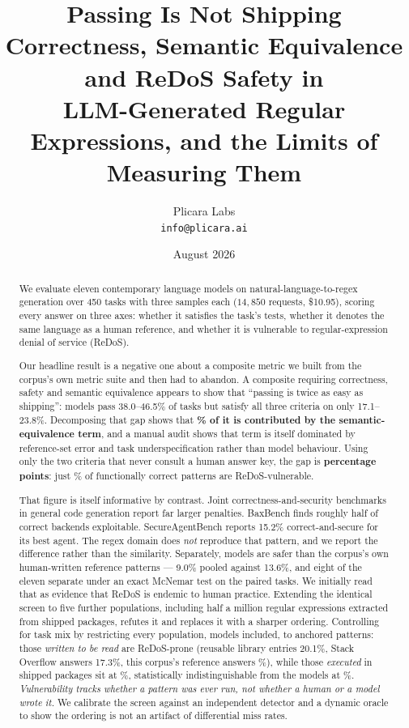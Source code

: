 \documentclass[11pt]{article}
\title{\textbf{Passing Is Not Shipping}\\[0.4em]
\large Correctness, Semantic Equivalence and ReDoS Safety in\\
LLM-Generated Regular Expressions, and the Limits of Measuring Them}
\author{Plicara Labs\\\texttt{info@plicara.ai}}
\date{August 2026}
\begin{document}
\maketitle

\begin{abstract}
\noindent
We evaluate eleven contemporary language models on natural-language-to-regex
generation over 450 tasks with three samples each ($14{,}850$ requests,
\$10.95), scoring every answer on three axes: whether it satisfies the task's
tests, whether it denotes the same language as a human reference, and whether
it is vulnerable to regular-expression denial of service (ReDoS).

Our headline result is a negative one about a composite metric we built from
the corpus's own metric suite and then had to abandon. A composite requiring correctness,
safety and semantic equivalence appears to show that ``passing is twice as
easy as shipping'': models pass 38.0--46.5\% of tasks but satisfy all three
criteria on only 17.1--23.8\%. Decomposing that gap shows that
\textbf{\equivshare{}\% of it is contributed by the semantic-equivalence term}, and a
manual audit shows that term is itself dominated by reference-set error and
task underspecification rather than model behaviour. Using only the two
criteria that never consult a human answer key, the gap is
\textbf{\safetyloss{} percentage points}: just \vulngivencorrect{}\% of functionally correct patterns
are ReDoS-vulnerable.

That figure is itself informative by contrast. Joint correctness-and-security
benchmarks in general code generation report far larger penalties. BaxBench
finds roughly half of correct backends exploitable. SecureAgentBench reports
15.2\% correct-and-secure for its best agent. The regex domain does \emph{not}
reproduce that pattern, and we report the difference rather than the
similarity. Separately, models are safer than the corpus's own human-written
reference patterns --- 9.0\% pooled against 13.6\%, and eight of the eleven
separate under an exact McNemar test on the paired tasks. We initially read
that as evidence that ReDoS is endemic to human practice. Extending the
identical screen to five further populations, including half a million
regular expressions extracted from shipped packages, refutes it and replaces
it with a sharper ordering. Controlling for task mix by restricting every
population, models included, to anchored patterns: those \emph{written to be
read} are ReDoS-prone (reusable library entries 20.1\%, Stack Overflow
answers 17.3\%, this corpus's reference answers \anchoredgold{}\%), while those
\emph{executed} in shipped packages sit at \anchoredprod{}\%, statistically
indistinguishable from the models at \anchoredmodels{}\%. \emph{Vulnerability tracks
whether a pattern was ever run, not whether a human or a model wrote it.} We
calibrate the screen against an independent detector and a dynamic oracle to
show the ordering is not an artifact of differential miss rates.


\end{abstract}
\end{document}
